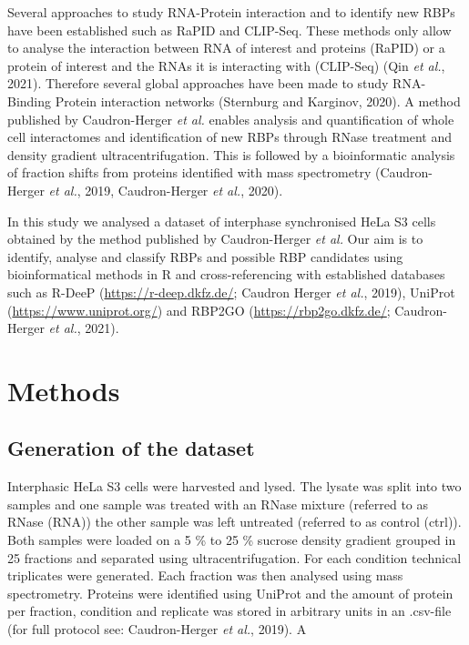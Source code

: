 \documentclass[
]{article}
\begin{document}
Several approaches to study RNA-Protein interaction and to identify new
RBPs have been established such as RaPID and CLIP-Seq. These methods
only allow to analyse the interaction between RNA of interest and
proteins (RaPID) or a protein of interest and the RNAs it is interacting
with (CLIP-Seq) (Qin \emph{et al.}, 2021). Therefore several global
approaches have been made to study RNA-Binding Protein interaction
networks (Sternburg and Karginov, 2020). A method published by
Caudron-Herger \emph{et al.} enables analysis and quantification of
whole cell interactomes and identification of new RBPs through RNase
treatment and density gradient ultracentrifugation. This is followed by
a bioinformatic analysis of fraction shifts from proteins identified
with mass spectrometry (Caudron-Herger \emph{et al.}, 2019,
Caudron-Herger \emph{et al.}, 2020).

In this study we analysed a dataset of interphase synchronised HeLa S3
cells obtained by the method published by Caudron-Herger \emph{et al.}
Our aim is to identify, analyse and classify RBPs and possible RBP
candidates using bioinformatical methods in R and cross-referencing with
established databases such as R-DeeP (\url{https://r-deep.dkfz.de/};
Caudron Herger \emph{et al.}, 2019), UniProt
(\url{https://www.uniprot.org/}) and RBP2GO
(\url{https://rbp2go.dkfz.de/}; Caudron-Herger \emph{et al.}, 2021).

\newpage

\hypertarget{methods}{%
\section{Methods}\label{methods}}

\hypertarget{generation-of-the-dataset}{%
\subsection{Generation of the dataset}\label{generation-of-the-dataset}}

Interphasic HeLa S3 cells were harvested and lysed. The lysate was split
into two samples and one sample was treated with an RNase mixture
(referred to as RNase (RNA)) the other sample was left untreated
(referred to as control (ctrl)). Both samples were loaded on a 5 \% to
25 \% sucrose density gradient grouped in 25 fractions and separated
using ultracentrifugation. For each condition technical triplicates were
generated. Each fraction was then analysed using mass spectrometry.
Proteins were identified using UniProt and the amount of protein per
fraction, condition and replicate was stored in arbitrary units in an
.csv-file (for full protocol see: Caudron-Herger \emph{et al.}, 2019). A
\end{document}
